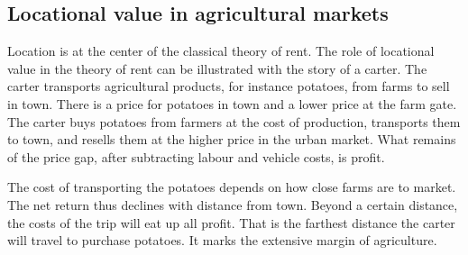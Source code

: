 

\subsection{Locational value in agricultural markets}
Location is at the center of the classical theory of rent. The role of locational value in the theory of \gls{rent} can be illustrated with the story of a carter. The carter transports agricultural products, for instance potatoes, from farms to sell in town. %
There is a price for potatoes in town and a lower price at the farm gate. The carter buys potatoes from farmers at the cost of production, transports them to town, and resells them at the higher price in the urban market. What remains of the price gap, after subtracting labour and vehicle costs, is profit. %

The cost of transporting the potatoes depends on how close farms are to market.  
The net return thus declines with distance from town. Beyond a certain distance, the costs of the trip will eat up all profit. That is the farthest distance the carter will travel to purchase potatoes. It marks the \gls{extensive margin} of agriculture. 



